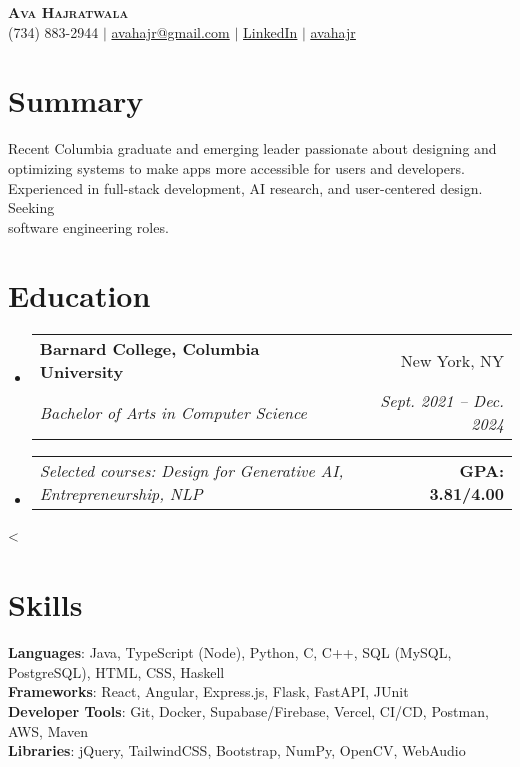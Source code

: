 \documentclass[letterpaper,11pt]{article}
\makeatletter
\newcommand{\resumeSubheading}[4]{
    \vspace{-2pt}\item
    \begin{tabular*}{0.97\textwidth}[t]{l@{\extracolsep{\fill}}r}
    \textbf{#1} & #2 \\
    \textit{\small#3} & \textit{\small #4} \\
    \end{tabular*}\vspace{-7pt}
}
\newcommand{\relevantCourseWorkAndGPA}[2]{
    \item
    \begin{tabular*}{0.97\textwidth}{l@{\extracolsep{\fill}}r}
    \textit{Selected courses: \small#1} & \textbf{\small GPA: #2/4.00} \\
    \end{tabular*}\vspace{-7pt}
}
\newcommand{\conditionalVspace}[1]{%
\ifnum\value{enumi}<\value{enumii}%
\vspace{#1}%
\fi
}
\newcommand{\resumeSubHeadingListStart}{\begin{itemize}[leftmargin=0.15in, label={}] \setlength{\itemsep}{7pt}}
\newcommand{\resumeSubHeadingListEnd}{\end{itemize}\conditionalVspace{7pt}}
\makeatother
\begin{document}
\begin{center}
\textbf{\Huge \scshape Ava Hajratwala} \\ \vspace{1pt}
\small (734) 883-2944 $|$ \href{mailto:avahajr@gmail.com}{{avahajr@gmail.com}} $|$
\href{https://linkedin.com/in/avahajr}{\color{blue} \underline{LinkedIn}} $|$
{\faGithub} \href{https://github.com/avahajr}{\color{blue}\underline{avahajr}}
\end{center}

\section{Summary}
\small {
    Recent Columbia graduate and emerging leader passionate about designing and optimizing systems to make apps more accessible for users and developers.
    Experienced in full-stack development, AI research, and user-centered design. Seeking \\
software engineering roles.
}
\section{Education}
\resumeSubHeadingListStart
\resumeSubheading
{Barnard College, Columbia University}{New York, NY}
{Bachelor of Arts in Computer Science}{Sept. 2021 -- Dec. 2024}
\relevantCourseWorkAndGPA{Design for Generative AI, Entrepreneurship, NLP}{3.81}
\resumeSubHeadingListEnd

\section{Skills}
\begin{itemize}[leftmargin=0.15in, label={}]
\small{\item{
\textbf{Languages}{: Java, TypeScript (Node), Python, C, C++, SQL (MySQL, PostgreSQL), HTML, CSS, Haskell} \\
\textbf{Frameworks}{: React, Angular, Express.js, Flask, FastAPI, JUnit } \\
\textbf{Developer Tools}{: Git, Docker, Supabase/Firebase, Vercel, CI/CD, Postman, AWS, Maven} \\
\textbf{Libraries}{: jQuery, TailwindCSS, Bootstrap, NumPy, OpenCV, WebAudio}
}}
\end{itemize}

\end{document}
